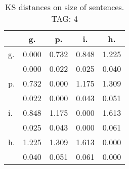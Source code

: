\begin{table}[h!]
\begin{center}
\begin{tabular}{| l | c | c | c | c |}\hline
 & g. & p. & i. & h. \\\hline
g. & 0.000  & 0.732  & 0.848  & 1.225 \\\hline
 & 0.000  & 0.022  & 0.025  & 0.040 \\\hline
p. & 0.732  & 0.000  & 1.175  & 1.309 \\\hline
 & 0.022  & 0.000  & 0.043  & 0.051 \\\hline
i. & 0.848  & 1.175  & 0.000  & 1.613 \\\hline
 & 0.025  & 0.043  & 0.000  & 0.061 \\\hline
h. & 1.225  & 1.309  & 1.613  & 0.000 \\\hline
 & 0.040  & 0.051  & 0.061  & 0.000 \\\hline
\end{tabular}
\caption{KS distances on size of sentences. TAG: 4}
\end{center}
\end{table}